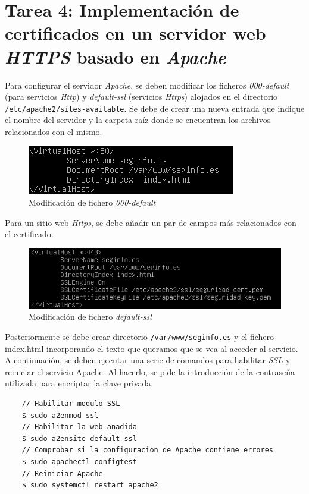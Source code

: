 \documentclass[10pt,a4paper]{article}
\begin{document}
\section{Tarea 4: Implementación de certificados en un servidor web \emph{HTTPS} basado en \emph{Apache}}


Para configurar el servidor \textit{Apache}, se deben modificar los ficheros \textit{000-default} (para servicios \textit{Http}) y \textit{default-ssl} (servicios \textit{Https}) alojados en el directorio \texttt{/etc/apache2/sites-available}. Se debe de crear una nueva entrada que indique el nombre del servidor y la carpeta raíz donde se encuentran los archivos relacionados con el mismo. \\
\begin{figure}[h!]
	\centering
	\includegraphics[scale=0.6]{images/tarea4_000default.png}
	\caption{Modificación de fichero \textit{000-default}}
	\label{fig:tarea4_000default}
\end{figure}

Para un sitio web \textit{Https}, se debe añadir un par de campos más relacionados con el certificado.\\

\begin{figure}[h!]
	\centering
	\includegraphics[scale=0.6]{images/tarea4_defaultssl.png}
	\caption{Modificación de fichero \textit{default-ssl}}
	\label{fig:tarea4_defaultssl}
\end{figure}

Posteriormente se debe crear directorio \texttt{/var/www/seginfo.es} y el fichero index.html incorporando el texto que queramos que se vea al acceder al servicio.\\
A continuación, se deben ejecutar una serie de comandos para habilitar \textit{SSL} y reiniciar el servicio Apache. Al hacerlo, se pide la introducción de la contraseña utilizada para encriptar la clave privada.\\
\begin{lstlisting}
	// Habilitar modulo SSL
	$ sudo a2enmod ssl
	// Habilitar la web anadida
	$ sudo a2ensite default-ssl
	// Comprobar si la configuracion de Apache contiene errores
	$ sudo apachectl configtest
	// Reiniciar Apache
	$ sudo systemctl restart apache2
\end{lstlisting}
\end{document}
